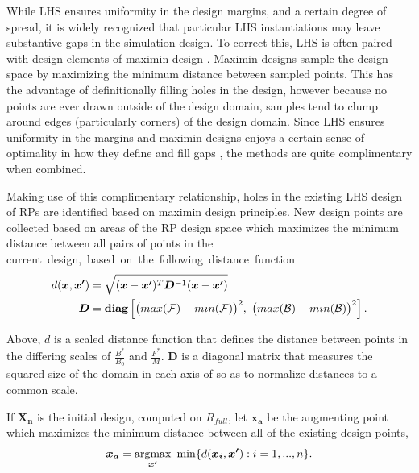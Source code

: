 \documentclass[12pt]{article}
\newcommand{\argmax}{\operatornamewithlimits{argmax}}
\begin{document}
%
While LHS ensures uniformity in the design margins, and a certain degree of spread, 
it is widely recognized that particular LHS instantiations may leave substantive gaps 
in the simulation design. To correct this, LHS is often paired with design elements 
of maximin design . Maximin designs sample 
the design space by maximizing the minimum distance between sampled points. 
This has the advantage of definitionally filling holes in the design, %
however because no points are ever drawn outside of the design domain, samples tend to 
clump around edges (particularly corners) of the design domain. Since LHS ensures 
uniformity in the margins and maximin designs enjoys a certain sense of optimality 
in how they define and fill gaps , the methods are 
quite complimentary when combined. 

Making use of this complimentary relationship, holes in the existing LHS design 
of RPs are identified based on maximin design principles. 
New design points are collected based on areas of the RP design 
space which maximizes the minimum distance between all pairs of points in the 
\mbox{current design, based on the following distance function}
\begin{align}
d(\bm{x}, \bm{x'}) &= \sqrt{(\bm{x}-\bm{x'})^T\bm{D}^{-1}(\bm{x}-\bm{x'})}\\
\bm{D} &= \bm{\mbox{diag}\left[} \big(max(\mathcal{F})-min(\mathcal{F})\big)^2, ~\big(max(\mathcal{B})-min(\mathcal{B})\big)^2 \bm{\right]}. \nonumber
\end{align}

%
Above, $d$ is a scaled distance function that defines the distance between 
points in the differing scales of $\frac{B^*}{B_0}$ and $\frac{F^*}{M}$.
$\bm{D}$ is a diagonal matrix that measures the squared size of the domain in each 
axis of so as to normalize distances to a common scale. 

%
If $\bm{X_n}$ is the initial design, computed on $R_{full}$, let $\bm{x_a}$ be the 
augmenting point which maximizes the minimum distance between all of the existing 
design points,
%
\begin{align}
	\bm{x_a} = \argmax_{\bm{x'}} ~\min\{ d(\bm{x_i}, \bm{x'}): i=1,...,n \}.
\end{align} 
%
\end{document}
